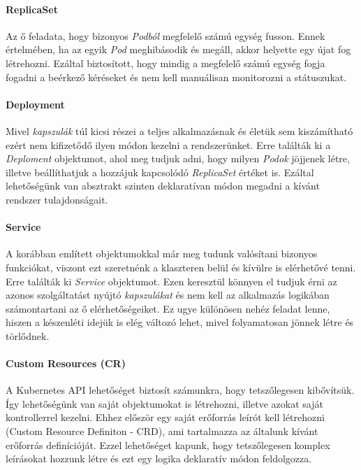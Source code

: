\paragraph{ReplicaSet} 
Az ő feladata, hogy bizonyos \textit{Podból} megfelelő számú egység fusson. Ennek értelmében, ha az egyik \textit{Pod} meghibásodik és megáll, akkor helyette egy újat fog létrehozni. Ezáltal biztosított, hogy mindig a megfelelő számú egység fogja fogadni a beérkező kéréseket és nem kell manuálisan monitorozni a státuszukat.

\paragraph{Deployment}
Mivel \textit{kapszulák} túl kicsi részei a teljes alkalmazásnak és életük sem kiszámítható ezért nem kifizetődő ilyen módon kezelni a rendszerünket. Erre találták ki a \textit{Deploment} objektumot, ahol meg tudjuk adni, hogy milyen \textit{Podok} jöjjenek létre, illetve beállíthatjuk a hozzájuk kapcsolódó \textit{ReplicaSet} értéket is. Ezáltal lehetőségünk van absztrakt szinten deklaratívan módon megadni a kívánt rendszer tulajdonságait.

\paragraph{Service}
A korábban említett objektumokkal már meg tudunk valósítani bizonyos funkciókat, viszont ezt szeretnénk a klaszteren belül és kívülre is elérhetővé tenni. Erre találták ki \textit{Service} objektumot. Ezen keresztül könnyen el tudjuk érni az azonos szolgáltatást nyújtó \textit{kapszulákat} és nem kell az alkalmazás logikában számontartani az ő elérhetőségeiket. Ez ugye különösen nehéz feladat lenne, hiszen a készenléti idejük is elég változó lehet, mivel folyamatosan jönnek létre és törlődnek.

\paragraph{Custom Resources (CR)}
A Kubernetes API lehetőséget biztosít számunkra, hogy tetszőlegesen kibővítsük. Így lehetőségünk van
saját objektumokat is létrehozni, illetve azokat saját kontrollerrel kezelni. Ehhez először egy
saját erőforrás leírót kell létrehozni (Custom Resource Definiton - CRD), ami tartalmazza az
általunk kívánt erőforrás definícióját. Ezzel lehetőséget kapunk, hogy tetszőlegesen komplex
leírásokat hozzunk létre és ezt egy logika deklaratív módon feldolgozza.

